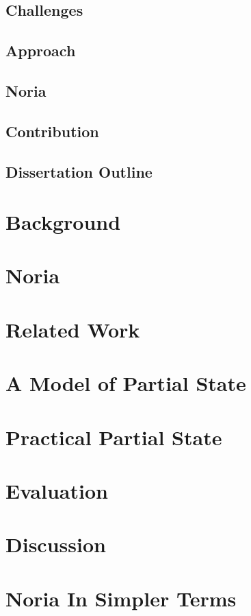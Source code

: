 \documentclass[fontsize=12pt,paper=letter,draft=true]{scrbook}
\begin{document}
\section{Challenges}
\section{Approach}
\section{Noria}
\section{Contribution}
\section{Dissertation Outline}

\chapter{Background}

\chapter{Noria}

\chapter{Related Work}

\chapter{A Model of Partial State}

\chapter{Practical Partial State}

\chapter{Evaluation}



\chapter{Discussion}

\appendix
\chapter{Noria In Simpler Terms}

\backmatter

\begin{spacing}{1}
\printbibliography
\end{spacing}
\end{document}
